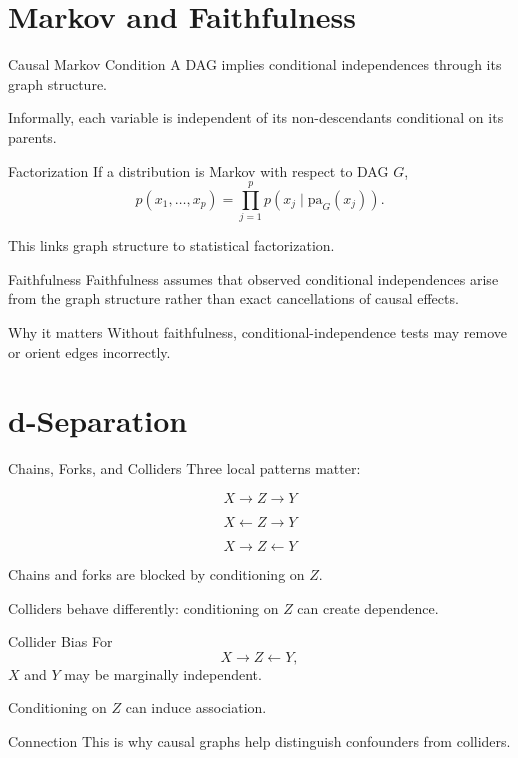 \documentclass[aspectratio=169,11pt]{beamer}
\begin{document}
\section{Markov and Faithfulness}

\begin{frame}{Causal Markov Condition}
A DAG implies conditional independences through its graph structure.

Informally, each variable is independent of its non-descendants conditional on its parents.
\end{frame}

\begin{frame}{Factorization}
If a distribution is Markov with respect to DAG \(G\),
\[
p(x_1,\ldots,x_p)
=
\prod_{j=1}^{p}
p(x_j \mid \mathrm{pa}_G(x_j)).
\]

This links graph structure to statistical factorization.
\end{frame}

\begin{frame}{Faithfulness}
Faithfulness assumes that observed conditional independences arise from the graph structure rather than exact cancellations of causal effects.

\begin{alertblock}{Why it matters}
Without faithfulness, conditional-independence tests may remove or orient edges incorrectly.
\end{alertblock}
\end{frame}

\section{d-Separation}

\begin{frame}{Chains, Forks, and Colliders}
Three local patterns matter:

\[
X \rightarrow Z \rightarrow Y
\]

\[
X \leftarrow Z \rightarrow Y
\]

\[
X \rightarrow Z \leftarrow Y
\]

Chains and forks are blocked by conditioning on \(Z\).

Colliders behave differently: conditioning on \(Z\) can create dependence.
\end{frame}

\begin{frame}{Collider Bias}
For
\[
X \rightarrow Z \leftarrow Y,
\]
\(X\) and \(Y\) may be marginally independent.

Conditioning on \(Z\) can induce association.

\begin{block}{Connection}
This is why causal graphs help distinguish confounders from colliders.
\end{block}
\end{frame}
\end{document}
